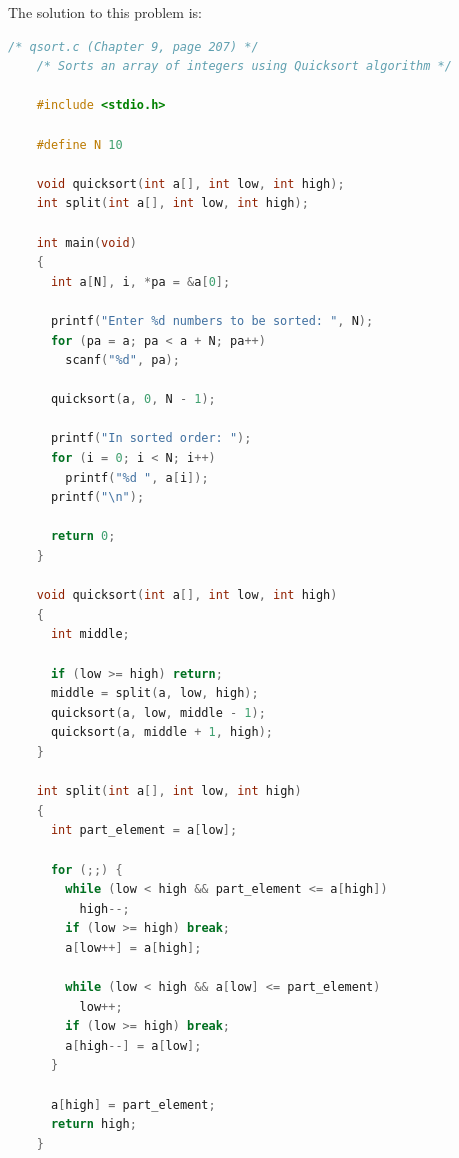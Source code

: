 \documentclass[12pt]{article}
\begin{document}
\begin{enumerate}[1.]
    The solution to this problem is:

    \bigskip

\begin{lstlisting}[language=c]
    /* qsort.c (Chapter 9, page 207) */
    /* Sorts an array of integers using Quicksort algorithm */

    #include <stdio.h>

    #define N 10

    void quicksort(int a[], int low, int high);
    int split(int a[], int low, int high);

    int main(void)
    {
      int a[N], i, *pa = &a[0];

      printf("Enter %d numbers to be sorted: ", N);
      for (pa = a; pa < a + N; pa++)
        scanf("%d", pa);

      quicksort(a, 0, N - 1);

      printf("In sorted order: ");
      for (i = 0; i < N; i++)
        printf("%d ", a[i]);
      printf("\n");

      return 0;
    }

    void quicksort(int a[], int low, int high)
    {
      int middle;

      if (low >= high) return;
      middle = split(a, low, high);
      quicksort(a, low, middle - 1);
      quicksort(a, middle + 1, high);
    }

    int split(int a[], int low, int high)
    {
      int part_element = a[low];

      for (;;) {
        while (low < high && part_element <= a[high])
          high--;
        if (low >= high) break;
        a[low++] = a[high];

        while (low < high && a[low] <= part_element)
          low++;
        if (low >= high) break;
        a[high--] = a[low];
      }

      a[high] = part_element;
      return high;
    }
\end{lstlisting}

\end{enumerate}
\end{document}
